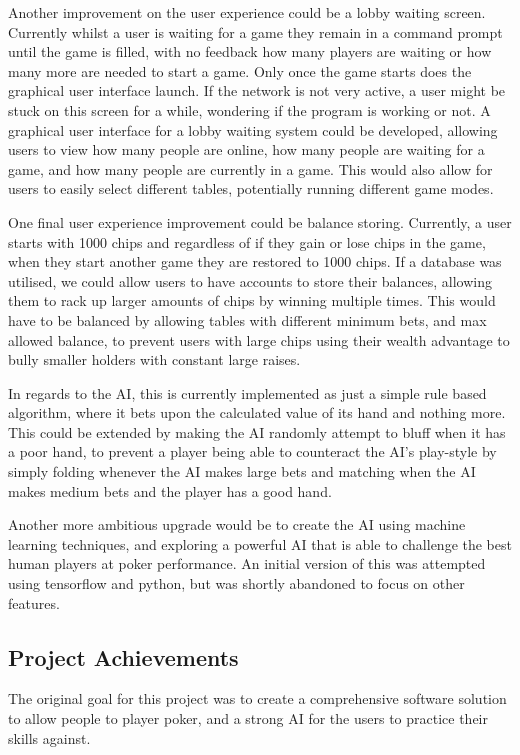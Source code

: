 Another improvement on the user experience could be a lobby waiting screen.
Currently whilst a user is waiting for a game they remain in a command prompt
until the game is filled, with no feedback how many players are waiting or
how many more are needed to start a game. Only once the game starts does the
graphical user interface launch. If the network is not very active, a user
might be stuck on this screen for a while, wondering if the program is working
or not. A graphical user interface for a lobby waiting system could be
developed, allowing users to view how many people are online, how many
people are waiting for a game, and how many people are currently in a game.
This would also allow for users to easily select different tables, potentially
running different game modes.

One final user experience improvement could be balance storing. Currently,
a user starts with 1000 chips and regardless of if they gain or lose chips
in the game, when they start another game they are restored to 1000 chips.
If a database was utilised, we could allow users to have accounts to store
their balances, allowing them to rack up larger amounts of chips by winning
multiple times. This would have to be balanced by allowing tables with
different minimum bets, and max allowed balance, to prevent users with
large chips using their wealth advantage to bully smaller holders with constant
large raises.

In regards to the AI, this is currently implemented as just a simple rule
based algorithm, where it bets upon the calculated value of its hand and nothing
more. This could be extended by making the AI randomly attempt to bluff when
it has a poor hand, to prevent a player being able to counteract the AI's
play-style by simply folding whenever the AI makes large bets and matching when
the AI makes medium bets and the player has a good hand.

Another more ambitious upgrade would be to create the AI using machine learning
techniques, and exploring a powerful AI that is able to challenge the best
human players at poker performance. An initial version of this was attempted
using tensorflow and python, but was shortly abandoned to focus on other
features.

\subsection{Project Achievements}
The original goal for this project was to create a comprehensive software
solution to allow people to player poker, and a strong AI for the users to
practice their skills against.

